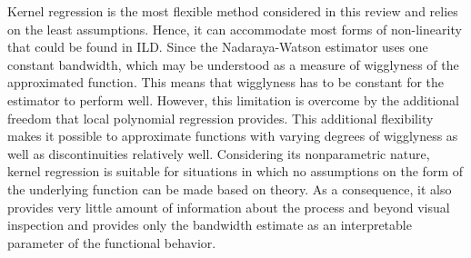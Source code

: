 Kernel regression is the most flexible method considered in this review and relies on the least assumptions. 
Hence, it can accommodate most forms of non-linearity that could be found in ILD. Since the Nadaraya-Watson
estimator uses one constant bandwidth, which may be understood as a measure of wigglyness of the approximated function.
This means that wigglyness has to be constant for the estimator to perform well. However, 
this limitation is overcome by the additional freedom that local polynomial regression provides. This additional 
flexibility makes it possible to approximate functions with varying degrees of wigglyness as 
well as discontinuities relatively well. Considering its nonparametric nature, kernel regression is suitable for situations
in which no assumptions on the form of the underlying function can be made based on theory. As a consequence, 
it also provides very little amount of information about the process and beyond visual inspection and
provides only the bandwidth estimate as an interpretable parameter of the functional behavior. 
